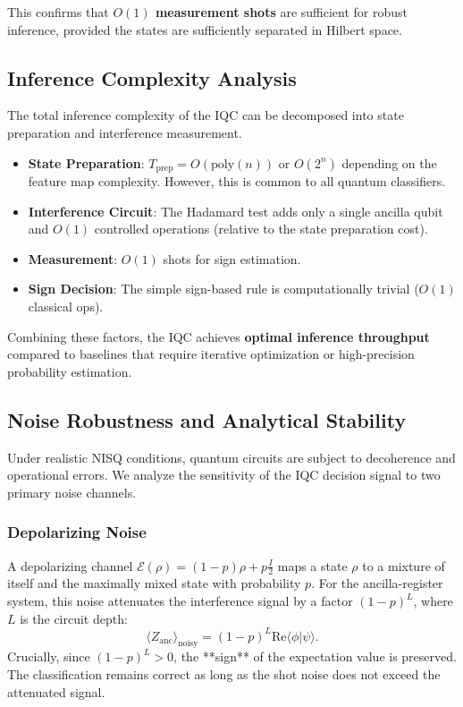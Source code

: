\documentclass[conference]{IEEEtran}
\begin{document}
This confirms that \textbf{$O(1)$ measurement shots} are sufficient for robust inference, provided the states are sufficiently separated in Hilbert space.

\subsection{Inference Complexity Analysis}

The total inference complexity of the IQC can be decomposed into state preparation and interference measurement.
\begin{itemize}
    \item \textbf{State Preparation}: $T_{\text{prep}} = O(\text{poly}(n))$ or $O(2^n)$ depending on the feature map complexity. However, this is common to all quantum classifiers.
    \item \textbf{Interference Circuit}: The Hadamard test adds only a single ancilla qubit and $O(1)$ controlled operations (relative to the state preparation cost).
    \item \textbf{Measurement}: $O(1)$ shots for sign estimation.
    \item \textbf{Sign Decision}: The simple sign-based rule is computationally trivial ($O(1)$ classical ops).
\end{itemize}
Combining these factors, the IQC achieves \textbf{optimal inference throughput} compared to baselines that require iterative optimization or high-precision probability estimation.

\subsection{Noise Robustness and Analytical Stability}

Under realistic NISQ conditions, quantum circuits are subject to decoherence and operational errors. We analyze the sensitivity of the IQC decision signal to two primary noise channels.

\subsubsection{Depolarizing Noise}
A depolarizing channel $\mathcal{E}(\rho) = (1-p)\rho + p\frac{I}{2}$ maps a state $\rho$ to a mixture of itself and the maximally mixed state with probability $p$. For the ancilla-register system, this noise attenuates the interference signal by a factor $(1-p)^L$, where $L$ is the circuit depth:
\begin{equation}
    \langle Z_{\text{anc}} \rangle_{\text{noisy}} = (1-p)^L \mathrm{Re}\langle \phi | \psi \rangle.
\end{equation}
Crucially, since $(1-p)^L > 0$, the **sign** of the expectation value is preserved. The classification remains correct as long as the shot noise does not exceed the attenuated signal.
\end{document}
